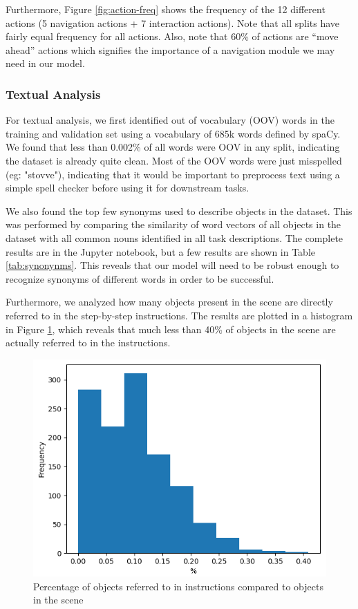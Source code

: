 \documentclass[11pt,a4paper]{article}
\begin{document}
Furthermore, Figure \ref{fig:action-freq} shows the frequency of the 12 different actions (5 navigation actions + 7 interaction actions). Note that all splits have fairly equal frequency for all actions. Also, note that 60\% of actions are ``move ahead'' actions which signifies the importance of a navigation module we may need in our model.

\subsubsection{Textual Analysis}
For textual analysis, we first identified out of vocabulary (OOV) words in the training and validation set using a vocabulary of 685k words defined by spaCy. We found that less than 0.002\% of all words were OOV in any split, indicating the dataset is already quite clean. Most of the OOV words were just misspelled (eg: "stovve"), indicating that it would be important to preprocess text using a simple spell checker before using it for downstream tasks.

We also found the top few synonyms used to describe objects in the dataset. This was performed by comparing the similarity of word vectors of all objects in the dataset with all common nouns identified in all task descriptions. The complete results are in the Jupyter notebook, but a few results are shown in Table \ref{tab:synonynms}. This reveals that our model will need to be robust enough to recognize synonyms of different words in order to be successful. 

Furthermore, we analyzed how many objects present in the scene are directly referred to in the step-by-step instructions. The results are plotted in a histogram in Figure \ref{fig:object-vs-instruction}, which reveals that much less than 40\% of objects in the scene are actually referred to in the instructions. 

\begin{figure}[H]
\centering
\includegraphics[scale=0.33]{figures/objects_vs_instructions.png}
\caption{Percentage of objects referred to in instructions compared to objects in the scene}
\label{fig:object-vs-instruction}
\end{figure}
\end{document}
